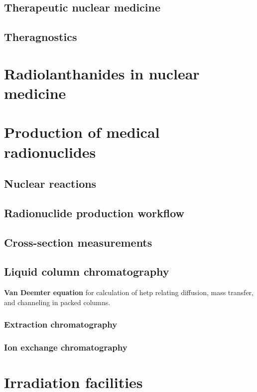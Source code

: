 \subsection{Therapeutic nuclear medicine}

\subsection{Theragnostics}

\section{Radiolanthanides in nuclear medicine}

\section{Production of medical radionuclides}

\subsection{Nuclear reactions}

\subsection{Radionuclide production workflow}

\subsection{Cross-section measurements}

\subsection{Liquid column chromatography}

\textbf{Van Deemter equation} for calculation of \acrfull{hetp} relating diffusion, mass transfer, and channeling in packed columns.

\subsubsection{Extraction chromatography}

\subsubsection{Ion exchange chromatography}

\section{Irradiation facilities}

